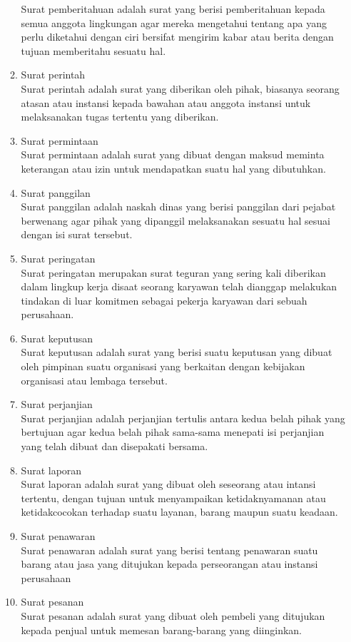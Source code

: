 \begin{enumerate}
\begin{enumerate}
		Surat pemberitahuan adalah surat yang berisi pemberitahuan kepada semua anggota lingkungan agar mereka mengetahui tentang apa yang perlu diketahui dengan ciri bersifat mengirim kabar atau berita dengan tujuan memberitahu sesuatu hal.
		\item Surat perintah \\
		Surat perintah adalah surat yang diberikan oleh pihak, biasanya seorang atasan atau instansi kepada bawahan atau anggota instansi untuk melaksanakan tugas tertentu yang diberikan.
		\item Surat permintaan \\
		Surat permintaan adalah surat yang dibuat dengan maksud meminta keterangan atau izin untuk mendapatkan suatu hal yang dibutuhkan. 
		\item Surat panggilan \\
		Surat panggilan adalah naskah dinas yang berisi panggilan dari pejabat berwenang agar pihak yang dipanggil melaksanakan sesuatu hal sesuai dengan isi surat tersebut.
		\item Surat peringatan \\
		Surat peringatan merupakan surat teguran yang sering kali diberikan dalam lingkup kerja disaat seorang karyawan telah dianggap melakukan tindakan di luar komitmen sebagai pekerja karyawan dari sebuah perusahaan.
		\item Surat keputusan \\
		Surat keputusan adalah surat yang berisi suatu keputusan yang dibuat oleh pimpinan suatu organisasi yang berkaitan dengan kebijakan organisasi atau lembaga tersebut.
		\item Surat perjanjian \\
		Surat perjanjian adalah perjanjian tertulis antara kedua belah pihak yang bertujuan agar kedua belah pihak sama-sama menepati isi perjanjian yang telah dibuat dan disepakati bersama.
		\item Surat laporan \\
		Surat laporan adalah surat yang  dibuat oleh seseorang atau intansi tertentu, dengan tujuan untuk menyampaikan ketidaknyamanan atau ketidakcocokan terhadap suatu layanan, barang maupun suatu keadaan.
		\item Surat penawaran \\
		Surat penawaran adalah surat yang berisi tentang penawaran suatu barang atau jasa yang ditujukan kepada perseorangan atau instansi perusahaan 
		\item Surat pesanan \\
		Surat pesanan adalah surat yang dibuat oleh pembeli yang ditujukan kepada penjual untuk memesan barang-barang yang diinginkan.

\end{enumerate}
\end{enumerate}
